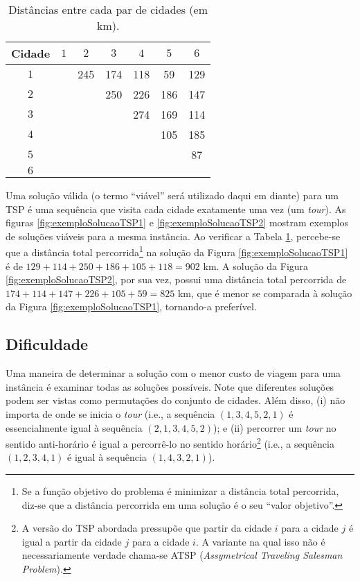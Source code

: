 \begin{table}[t]
\caption{Distâncias entre cada par de cidades (em km).}
\label{tab:tabelaDistancias}
\centering
\begin{tabular}{ccccccc}
\hline
\textbf{Cidade} & \(1\) & \(2\) & $3$ & $4$ & $5$ & $6$ \\ \hline
$1$             &       & 245   & 174 & 118 & 59  & 129 \\
$2$             &       &       & 250 & 226 & 186  & 147  \\
$3$             &       &       &     & 274 & 169 & 114  \\
$4$             &       &       &     &     & 105  & 185 \\
$5$             &       &       &     &     &     & 87  \\
$6$             &       &       &     &     &     &     \\ \hline
\end{tabular}
\end{table}


Uma solução válida (o termo ``viável'' será utilizado daqui em diante) para um TSP é uma sequência que visita cada cidade exatamente uma vez (um \textit{tour}). As figuras \ref{fig:exemploSolucaoTSP1} e \ref{fig:exemploSolucaoTSP2} mostram exemplos de soluções viáveis para a mesma instância. Ao verificar a Tabela \ref{tab:tabelaDistancias}, percebe-se que a distância total percorrida\footnote{Se a função objetivo do problema é minimizar a distância total percorrida, diz-se que a distância percorrida em uma solução é  o seu ``valor objetivo''.} na solução da Figura \ref{fig:exemploSolucaoTSP1} é de \(129 + 114 + 250 + 186 + 105 + 118 = 902\) km. A solução da Figura \ref{fig:exemploSolucaoTSP2}, por sua vez, possui uma distância total percorrida de \(174 + 114 + 147 + 226 + 105 + 59 = 825\) km, que é menor se comparada à solução da Figura \ref{fig:exemploSolucaoTSP1}, tornando-a preferível.



\subsection{Dificuldade}
Uma maneira de determinar a solução com o menor custo de viagem para uma instância é examinar todas as soluções possíveis. Note que diferentes soluções podem ser vistas como permutações do conjunto de cidades. Além disso, (i) não importa de onde se inicia o \textit{tour} (i.e., a sequência \((1, 3, 4, 5, 2, 1)\) é essencialmente igual à sequência \((2,1,3,4,5,2)\)); e (ii) percorrer um \textit{tour} no sentido anti-horário é igual a percorrê-lo no sentido horário\footnote{A versão do TSP abordada pressupõe que partir da cidade \(i\) para a cidade \(j\) é igual a partir da cidade \(j\) para a cidade \(i\). A variante na qual isso não é necessariamente verdade chama-se ATSP (\textit{Assymetrical Traveling Salesman Problem}).} (i.e., a sequência \((1,2,3,4,1)\) é igual à sequência \((1,4,3,2,1)\)). 

